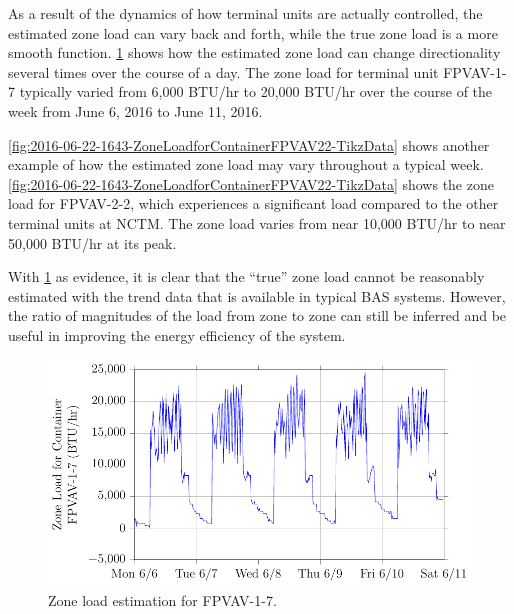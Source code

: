 As a result of the dynamics of how  terminal units are actually
controlled, the estimated zone load can vary back and forth, while the
true zone load is a more smooth function. \figref{}
\ref{fig:2016-06-22-1654-ZoneLoadforContainerFPVAV17-TikzData} shows how
the estimated zone load can change directionality several times over the
course of a day. The zone load for terminal unit FPVAV-1-7 typically
varied from 6,000 BTU/hr to 20,000 BTU/hr over the course of the week
from June 6, 2016 to June 11, 2016.

\figref{} \ref{fig:2016-06-22-1643-ZoneLoadforContainerFPVAV22-TikzData}
shows another example of how the estimated zone load may vary throughout
a typical week. \figref{}
\ref{fig:2016-06-22-1643-ZoneLoadforContainerFPVAV22-TikzData} shows the
zone load for FPVAV-2-2, which experiences a significant load compared
to the other terminal units at NCTM. The zone load varies from near
10,000 BTU/hr to near 50,000 BTU/hr at its peak.

With \figref{}
\ref{fig:2016-06-22-1654-ZoneLoadforContainerFPVAV17-TikzData} as
evidence, it is clear that the ``true'' zone load cannot be reasonably
estimated with the trend data that is available in typical BAS systems.
However, the ratio of magnitudes of the load from zone to zone can still
be inferred and be useful in improving the energy efficiency of the
system.  

\begin{figure}
\centering
\includegraphics[]{Plots/2016-06-22-1654-ZoneLoadforContainerFPVAV17-TikzData.pdf}
\caption{Zone load estimation for FPVAV-1-7.}
\label{fig:2016-06-22-1654-ZoneLoadforContainerFPVAV17-TikzData}
\end{figure}

